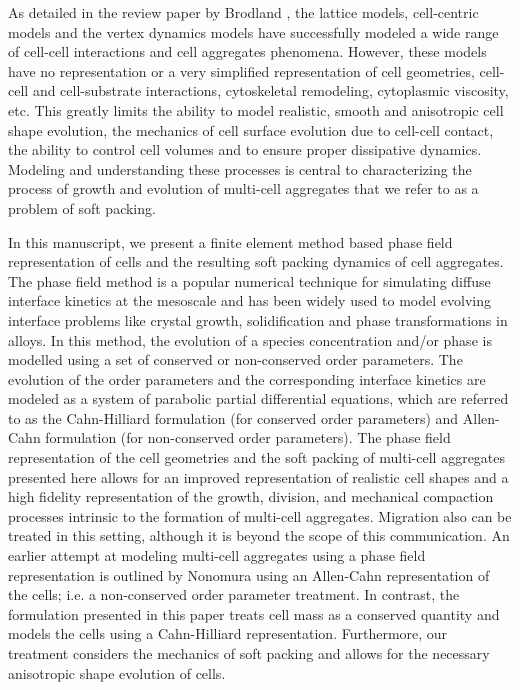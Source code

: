 \documentclass{article}
\begin{document}
As detailed in the review paper by Brodland \cite{Brodland2004}, the lattice models, cell-centric models and the vertex dynamics models have successfully modeled a wide range of cell-cell interactions and cell aggregates phenomena. However, these models have no representation or a very simplified representation of cell geometries, cell-cell and cell-substrate interactions, cytoskeletal remodeling, cytoplasmic viscosity, etc. This greatly limits the ability to model realistic, smooth and anisotropic cell shape evolution, the mechanics of cell surface evolution due to cell-cell contact, the ability to control cell volumes and to ensure proper dissipative dynamics. Modeling and understanding these processes is central to characterizing the process of growth and evolution of multi-cell aggregates that we refer to as a problem of soft packing.  

In this manuscript, we present a finite element method based phase field representation of cells and the resulting soft packing dynamics of cell aggregates. The phase field method is a popular numerical technique for simulating diffuse interface kinetics at the mesoscale and has been widely used to model evolving interface problems like crystal growth, solidification and phase transformations in alloys. In this method, the evolution of a species concentration and/or phase is modelled using a set of conserved or non-conserved order parameters. The evolution of the order parameters and the corresponding interface kinetics are modeled as a system of parabolic partial differential equations, which are referred to as the Cahn-Hilliard formulation (for conserved order parameters) \cite{Cahn1958} and Allen-Cahn formulation (for non-conserved order parameters)\cite{Cahn1979}. The phase field representation of the cell geometries and the soft packing of multi-cell aggregates presented here allows for an improved representation of realistic cell shapes and a high fidelity representation of the growth, division, and mechanical compaction processes intrinsic to the formation of multi-cell aggregates. Migration also can be treated in this setting, although it is beyond the scope of this communication. An earlier attempt at modeling multi-cell aggregates using a phase field representation is outlined by Nonomura \cite{Nonomura2012} using an Allen-Cahn representation of the cells; i.e. a non-conserved order parameter treatment. In contrast, the formulation presented in this paper treats cell mass as a conserved quantity and models the cells using a Cahn-Hilliard representation. Furthermore, our treatment considers the mechanics of soft packing and allows for the necessary anisotropic shape evolution of cells. 
\end{document}
